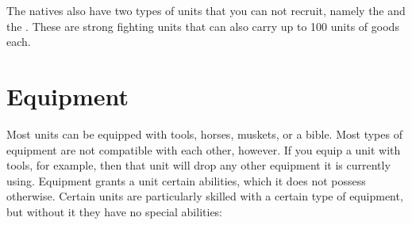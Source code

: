 \documentclass[12pt]{book}
\begin{document}
The natives also have two types of units that you can not recruit,
namely the  and the . These are
strong fighting units that can also carry up to 100 units of goods
each.


\hypertarget{Equipment}{\section{Equipment}}

Most units can be equipped with tools, horses, muskets, or a bible.
Most types of equipment are not compatible with each other,
however. If you equip a unit with tools, for example, then that unit
will drop any other equipment it is currently using. Equipment grants
a unit certain abilities, which it does not possess otherwise. Certain
units are particularly skilled with a certain type of equipment, but
without it they have no special abilities:
\end{document}

